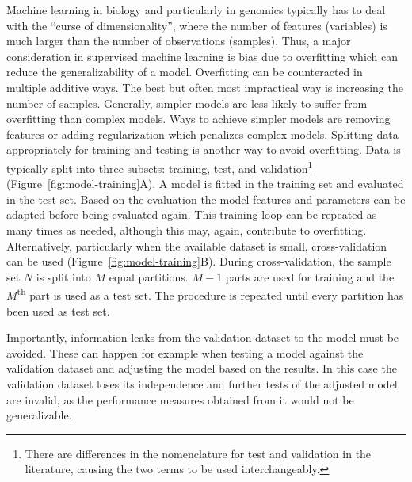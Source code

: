 \documentclass[11pt]{book}
\begin{document}
Machine learning in biology and particularly in genomics typically has to deal with the ``curse of dimensionality'', where the number of features (variables) is much larger than the number of observations (samples). Thus, a major consideration in supervised machine learning is bias due to overfitting which can reduce the generalizability of a model. Overfitting can be counteracted in multiple additive ways. The best but often most impractical way is increasing the number of samples. Generally, simpler models are less likely to suffer from overfitting than complex models. Ways to achieve simpler models are removing features or adding regularization which penalizes complex models. Splitting data appropriately for training and testing is another way to avoid overfitting. Data is typically split into three subsets: training, test, and validation\footnote{There are differences in the nomenclature for test and validation in the literature, causing the two terms to be used interchangeably.} (Figure~\ref{fig:model-training}A). A model is fitted in the training set and evaluated in the test set. Based on the evaluation the model features and parameters can be adapted before being evaluated again. This training loop can be repeated as many times as needed, although this may, again, contribute to overfitting. Alternatively, particularly when the available dataset is small, cross-validation can be used (Figure~\ref{fig:model-training}B). During cross-validation, the sample set $N$ is split into $M$ equal partitions. $M-1$ parts are used for training and the $M$\textsuperscript{th} part is used as a test set. The procedure is repeated until every partition has been used as test set.

Importantly, information leaks from the validation dataset to the model must be avoided. These can happen for example when testing a model against the validation dataset and adjusting the model based on the results. In this case the validation dataset loses its independence and further tests of the adjusted model are invalid, as the performance measures obtained from it would not be generalizable.
\end{document}
